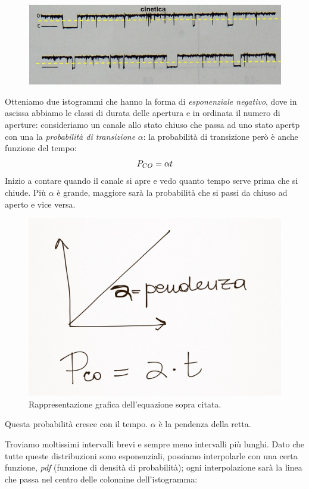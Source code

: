 \documentclass[a4paper,12pt]{article}
\begin{document}
\begin{figure}[H]
\centering
\includegraphics[scale=0.4]{immagine/cinetica.jpg}
\caption{}
\end{figure} 
Otteniamo due istogrammi che hanno la forma di \emph{esponenziale negativo}, dove in ascissa abbiamo le classi di durata delle apertura e in ordinata il numero di aperture: consideriamo un canale allo stato chiuso che passa ad uno stato apertp con una la \emph{probabilità di transizione} $\alpha$: la probabilità di transizione però è anche funzione del tempo:
\begin{equation}
\centering
P_{CO}= \alpha t
\end{equation}
Inizio a contare quando il canale si apre e vedo quanto tempo serve prima che si chiude. Più $\alpha$ è grande, maggiore sarà la probabilità che si passi da chiuso ad aperto e vice versa.

\begin{figure}[H]
\centering
\includegraphics[scale=0.1]{immagine/12.jpg}
\caption{Rappresentazione grafica dell'equazione sopra citata.}
\end{figure} 
Questa probabilità cresce con il tempo. $\alpha$ è la pendenza della retta.

Troviamo moltissimi intervalli brevi e sempre meno intervalli più  lunghi. Dato che tutte queste distribuzioni sono esponenziali, possiamo interpolarle con una certa funzione, \emph{pdf} (funzione di densità di probabilità); ogni interpolazione sarà la linea che passa nel centro delle colonnine dell'istogramma:
\end{document}
